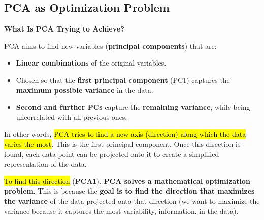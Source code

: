 \subsection{PCA as Optimization Problem}

\begin{flushleft}
    \textcolor{Green3}{ \textbf{What Is PCA Trying to Achieve?}}
\end{flushleft}
PCA aims to find new variables (\textbf{principal components}) that are:
\begin{itemize}
    \item \textbf{Linear combinations} of the original variables.
    \item Chosen so that the \textbf{first principal component} (PC1) captures the \textbf{maximum possible variance} in the data.
    \item \textbf{Second and further PCs} capture the \textbf{remaining variance}, while being uncorrelated with all previous ones.
\end{itemize}
In other words, \hl{PCA tries to find a new axis (direction) along which the data varies the most}. This is the first principal component. Once this direction is found, each data point can be projected onto it to create a simplified representation of the data.

\highspace
\hl{To find this direction} (\textbf{PCA1}), \textbf{PCA solves a mathematical optimization problem}. This is because the \textbf{goal is to find the direction that maximizes the variance} of the data projected onto that direction (we want to maximize the variance because it captures the most variability, information, in the data).

